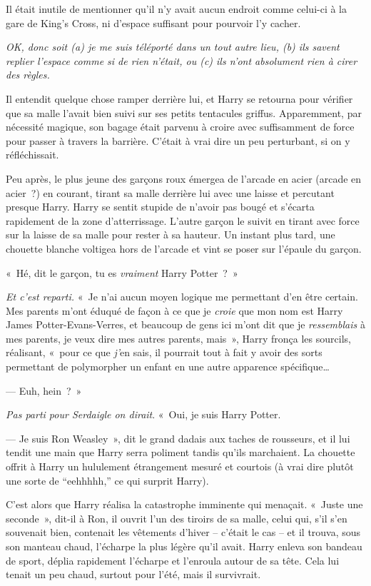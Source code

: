 Il était inutile de mentionner qu'il n'y avait aucun endroit comme celui-ci à la gare de King's Cross, ni d'espace suffisant pour pourvoir l'y cacher.

\emph{OK, donc soit (a) je me suis téléporté dans un tout autre lieu, (b) ils savent replier l'espace comme si de rien n'était, ou (c) ils n'ont absolument rien à cirer des règles.}

Il entendit quelque chose ramper derrière lui, et Harry se retourna pour vérifier que sa malle l'avait bien suivi sur ses petits tentacules griffus.
Apparemment, par nécessité magique, son bagage était parvenu à croire avec suffisamment de force pour passer à travers la barrière.
C'était à vrai dire un peu perturbant, si on y réfléchissait.

Peu après, le plus jeune des garçons roux émergea de l'arcade en acier (arcade en acier~?) en courant, tirant sa malle derrière lui avec une laisse et percutant presque Harry.
Harry se sentit stupide de n'avoir pas bougé et s'écarta rapidement de la zone d'atterrissage.
L'autre garçon le suivit en tirant avec force sur la laisse de sa malle pour rester à sa hauteur.
Un instant plus tard, une chouette blanche voltigea hors de l'arcade et vint se poser sur l'épaule du garçon.

«~Hé, dit le garçon, tu es \emph{vraiment} Harry Potter~?~»

\emph{Et c'est reparti.}
«~Je n'ai aucun moyen logique me permettant d'en être certain.
Mes parents m'ont éduqué de façon à ce que je \emph{croie} que mon nom est Harry James Potter-Evans-Verres, et beaucoup de gens ici m'ont dit que je \emph{ressemblais} à mes parents, je veux dire mes autres parents, mais~», Harry fronça les sourcils, réalisant, «~pour ce que \emph{j'}en sais, il pourrait tout à fait y avoir des sorts permettant de polymorpher un enfant en une autre apparence spécifique…

--- Euh, hein~?~»

\emph{Pas parti pour Serdaigle on dirait}. «~Oui, je suis Harry Potter.

--- Je suis Ron Weasley~», dit le grand dadais aux taches de rousseurs, et il lui tendit une main que Harry serra poliment tandis qu'ils marchaient.
La chouette offrit à Harry un hululement étrangement mesuré et courtois (à vrai dire plutôt une sorte de “eehhhhh,” ce qui surprit Harry).

C'est alors que Harry réalisa la catastrophe imminente qui menaçait.
«~Juste une seconde~», dit-il à Ron, il ouvrit l'un des tiroirs de sa malle, celui qui, s'il s'en souvenait bien, contenait les vêtements d'hiver -- c'était le cas -- et il trouva, sous son manteau chaud, l'écharpe la plus légère qu'il avait.
Harry enleva son bandeau de sport, déplia rapidement l'écharpe et l'enroula autour de sa tête.
Cela lui tenait un peu chaud, surtout pour l'été, mais il survivrait.

